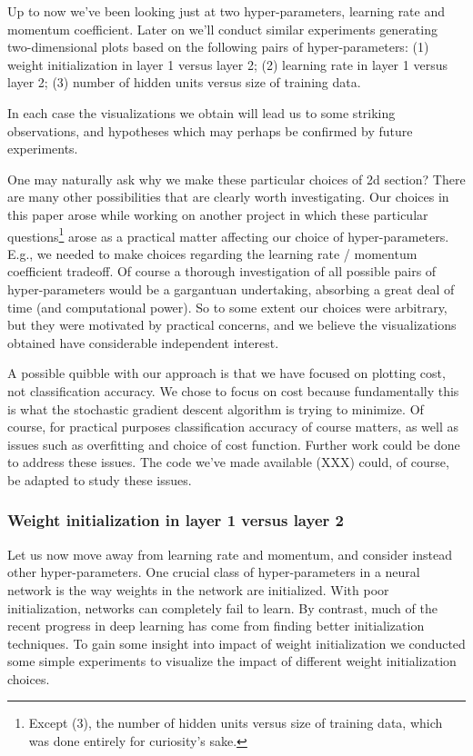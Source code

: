 \documentclass[10pt]{article}
\begin{document}
Up to now we've been looking just at two hyper-parameters, learning
rate and momentum coefficient.  Later on we'll conduct similar
experiments generating two-dimensional plots based on the following
pairs of hyper-parameters: (1) weight initialization in layer 1 versus
layer 2; (2) learning rate in layer 1 versus layer 2; (3) number of
hidden units versus size of training data.

In each case the visualizations we obtain will lead us to some
striking observations, and hypotheses which may perhaps be confirmed
by future experiments.

One may naturally ask why we make these particular choices of 2d
section?  There are many other possibilities that are clearly worth
investigating.  Our choices in this paper arose while working on
another project in which these particular questions\footnote{Except
  (3), the number of hidden units versus size of training data, which
  was done entirely for curiosity's sake.} arose as a practical matter
affecting our choice of hyper-parameters. E.g., we needed to make
choices regarding the learning rate / momentum coefficient tradeoff.
Of course a thorough investigation of all possible pairs of
hyper-parameters would be a gargantuan undertaking, absorbing a great
deal of time (and computational power).  So to some extent our choices
were arbitrary, but they were motivated by practical concerns, and we
believe the visualizations obtained have considerable independent
interest.

A possible quibble with our approach is that we have focused on
plotting cost, not classification accuracy.  We chose to focus on cost
because fundamentally this is what the stochastic gradient descent
algorithm is trying to minimize.  Of course, for practical purposes
classification accuracy of course matters, as well as issues such as
overfitting and choice of cost function.  Further work could be done
to address these issues.  The code we've made available (XXX) could,
of course, be adapted to study these issues.

\subsubsection*{Weight initialization in layer 1 versus layer 2}

Let us now move away from learning rate and momentum, and consider
instead other hyper-parameters.  One crucial class of hyper-parameters
in a neural network is the way weights in the network are initialized.
With poor initialization, networks can completely fail to learn.  By
contrast, much of the recent progress in deep learning has come from
finding better initialization techniques.  To gain some insight into
impact of weight initialization we conducted some simple experiments
to visualize the impact of different weight initialization choices.
\end{document}
